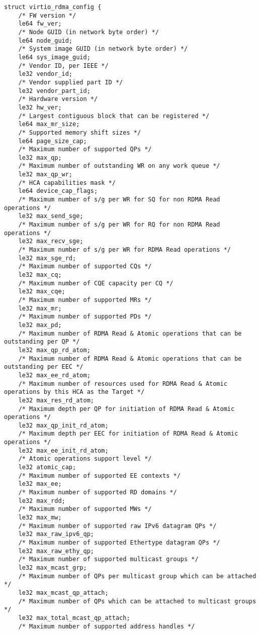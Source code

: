 \begin{lstlisting}
struct virtio_rdma_config {
    /* FW version */
    le64 fw_ver;
    /* Node GUID (in network byte order) */
    le64 node_guid;
    /* System image GUID (in network byte order) */
    le64 sys_image_guid;
    /* Vendor ID, per IEEE */
    le32 vendor_id;
    /* Vendor supplied part ID */
    le32 vendor_part_id;
    /* Hardware version */
    le32 hw_ver;
    /* Largest contiguous block that can be registered */
    le64 max_mr_size;
    /* Supported memory shift sizes */
    le64 page_size_cap;
    /* Maximum number of supported QPs */
    le32 max_qp;
    /* Maximum number of outstanding WR on any work queue */
    le32 max_qp_wr;
    /* HCA capabilities mask */
    le64 device_cap_flags;
    /* Maximum number of s/g per WR for SQ for non RDMA Read operations */
    le32 max_send_sge;
    /* Maximum number of s/g per WR for RQ for non RDMA Read operations */
    le32 max_recv_sge; 
    /* Maximum number of s/g per WR for RDMA Read operations */
    le32 max_sge_rd; 
    /* Maximum number of supported CQs */
    le32 max_cq;
    /* Maximum number of CQE capacity per CQ */
    le32 max_cqe;
    /* Maximum number of supported MRs */
    le32 max_mr;
    /* Maximum number of supported PDs */
    le32 max_pd;
    /* Maximum number of RDMA Read & Atomic operations that can be outstanding per QP */
    le32 max_qp_rd_atom;
    /* Maximum number of RDMA Read & Atomic operations that can be outstanding per EEC */
    le32 max_ee_rd_atom;
    /* Maximum number of resources used for RDMA Read & Atomic operations by this HCA as the Target */
    le32 max_res_rd_atom;
    /* Maximum depth per QP for initiation of RDMA Read & Atomic operations */
    le32 max_qp_init_rd_atom;
    /* Maximum depth per EEC for initiation of RDMA Read & Atomic operations */
    le32 max_ee_init_rd_atom;
    /* Atomic operations support level */
    le32 atomic_cap;
    /* Maximum number of supported EE contexts */
    le32 max_ee;
    /* Maximum number of supported RD domains */
    le32 max_rdd;
    /* Maximum number of supported MWs */
    le32 max_mw;
    /* Maximum number of supported raw IPv6 datagram QPs */
    le32 max_raw_ipv6_qp;
    /* Maximum number of supported Ethertype datagram QPs */
    le32 max_raw_ethy_qp;
    /* Maximum number of supported multicast groups */
    le32 max_mcast_grp;
    /* Maximum number of QPs per multicast group which can be attached */
    le32 max_mcast_qp_attach;
    /* Maximum number of QPs which can be attached to multicast groups */
    le32 max_total_mcast_qp_attach;
    /* Maximum number of supported address handles */

\end{lstlisting}
